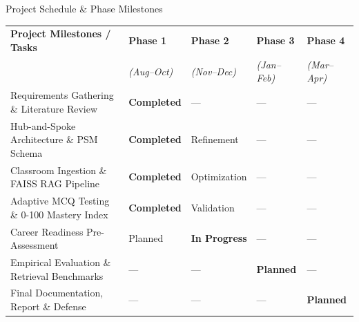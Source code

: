 \documentclass[aspectratio=169,10pt]{beamer}
\begin{document}
\begin{frame}{Project Schedule & Phase Milestones}
  \begin{table}[]
    \centering
    \small
    \begin{tabular}{lllll}
      \toprule
      \textbf{Project Milestones / Tasks} & \textbf{Phase 1} & \textbf{Phase 2} & \textbf{Phase 3} & \textbf{Phase 4} \\
      & \textit{(Aug--Oct)} & \textit{(Nov--Dec)} & \textit{(Jan--Feb)} & \textit{(Mar--Apr)} \\
      \midrule
      Requirements Gathering \& Literature Review & \cellcolor{softemerald!30}\textbf{Completed} & --- & --- & --- \\
      Hub-and-Spoke Architecture \& PSM Schema & \cellcolor{softemerald!30}\textbf{Completed} & Refinement & --- & --- \\
      Classroom Ingestion \& FAISS RAG Pipeline & \cellcolor{softemerald!30}\textbf{Completed} & Optimization & --- & --- \\
      Adaptive MCQ Testing \& 0-100 Mastery Index & \cellcolor{softemerald!30}\textbf{Completed} & Validation & --- & --- \\
      Career Readiness Pre-Assessment & Planned & \cellcolor{accentindigo!25}\textbf{In Progress} & --- & --- \\
      Empirical Evaluation \& Retrieval Benchmarks & --- & --- & \cellcolor{warnamber!25}\textbf{Planned} & --- \\
      Final Documentation, Report \& Defense & --- & --- & --- & \cellcolor{warnamber!25}\textbf{Planned} \\
      \bottomrule
    \end{tabular}
  \end{table}
\end{frame}
\end{document}
